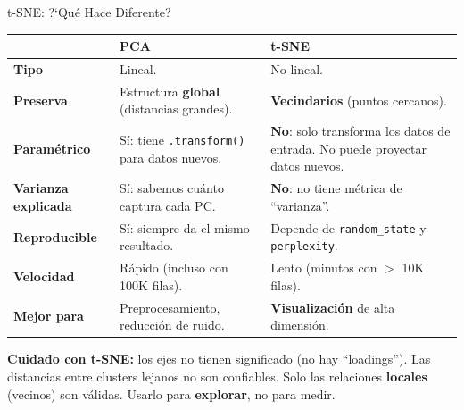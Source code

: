 \documentclass[aspectratio=169, 11pt]{beamer}
\begin{document}
\begin{frame}{t-SNE: ?`Qu\'e Hace Diferente?}
  \vspace{-4pt}
  {\scriptsize
  \begin{tabular}{@{}p{3.5cm}p{4.5cm}p{4.5cm}@{}}
    \toprule
     & \textbf{\color{codeBlue}PCA} & \textbf{\color{codePurple}t-SNE} \\
    \midrule
    \textbf{Tipo} & Lineal. & No lineal. \\
    \textbf{Preserva} & Estructura \textbf{global} (distancias grandes). & \textbf{Vecindarios} (puntos cercanos). \\
    \textbf{Param\'etrico} & S\'i: tiene \texttt{.transform()} para datos nuevos. & \textbf{No}: solo transforma los datos de entrada. No puede proyectar datos nuevos. \\
    \textbf{Varianza explicada} & S\'i: sabemos cu\'anto captura cada PC. & \textbf{No}: no tiene m\'etrica de ``varianza''. \\
    \textbf{Reproducible} & S\'i: siempre da el mismo resultado. & Depende de \texttt{random\_state} y \texttt{perplexity}. \\
    \textbf{Velocidad} & R\'apido (incluso con 100K filas). & Lento (minutos con $>$ 10K filas). \\
    \textbf{Mejor para} & Preprocesamiento, reducci\'on de ruido. & \textbf{Visualizaci\'on} de alta dimensi\'on. \\
    \bottomrule
  \end{tabular}
  }

  \vspace{6pt}
  \begin{tcolorbox}[colback=arcaRed!8, colframe=arcaRed, boxrule=0.5pt, arc=2pt,
    left=6pt, right=6pt, top=4pt, bottom=4pt]
    {\scriptsize\color{arcaDark}
    \faExclamationTriangle\hspace{4pt}\textbf{Cuidado con t-SNE:}
    los ejes no tienen significado (no hay ``loadings'').
    Las distancias entre clusters lejanos no son confiables.
    Solo las relaciones \textbf{locales} (vecinos) son v\'alidas.
    Usarlo para \textbf{explorar}, no para medir.}
  \end{tcolorbox}
\end{frame}
\end{document}
